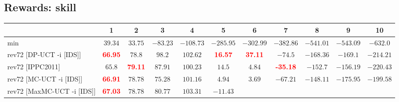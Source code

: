 \documentclass{article}
\begin{document}
\bigskip

\subsection*{Rewards: skill}

\begin{tabular}{|l|r@{$\pm$}rr@{$\pm$}rr@{$\pm$}rr@{$\pm$}rr@{$\pm$}rr@{$\pm$}rr@{$\pm$}rr@{$\pm$}rr@{$\pm$}rr@{$\pm$}r|}
\hline

& \multicolumn{2}{c}{1}
& \multicolumn{2}{c}{2}
& \multicolumn{2}{c}{3}
& \multicolumn{2}{c}{4}
& \multicolumn{2}{c}{5}
& \multicolumn{2}{c}{6}
& \multicolumn{2}{c}{7}
& \multicolumn{2}{c}{8}
& \multicolumn{2}{c}{9}
& \multicolumn{2}{c|}{10}
\\
\hline
\hline
min
& \multicolumn{2}{c}{$39.34$}
& \multicolumn{2}{c}{$33.75$}
& \multicolumn{2}{c}{$-83.23$}
& \multicolumn{2}{c}{$-108.73$}
& \multicolumn{2}{c}{$-285.95$}
& \multicolumn{2}{c}{$-302.99$}
& \multicolumn{2}{c}{$-382.86$}
& \multicolumn{2}{c}{$-541.01$}
& \multicolumn{2}{c}{$-543.09$}
& \multicolumn{2}{c|}{$-632.0$}
\\
rev72 [DP-UCT -i [IDS]]
& \multicolumn{2}{c}{\textbf{\textcolor{red}{66.95}}}
& \multicolumn{2}{c}{$78.8$}
& \multicolumn{2}{c}{$98.2$}
& \multicolumn{2}{c}{$102.62$}
& \multicolumn{2}{c}{\textbf{\textcolor{red}{16.57}}}
& \multicolumn{2}{c}{\textbf{\textcolor{red}{37.11}}}
& \multicolumn{2}{c}{$-74.5$}
& \multicolumn{2}{c}{$-168.36$}
& \multicolumn{2}{c}{$-169.1$}
& \multicolumn{2}{c|}{$-214.21$}
\\
rev72 [IPPC2011]
& \multicolumn{2}{c}{$65.8$}
& \multicolumn{2}{c}{\textbf{\textcolor{red}{79.11}}}
& \multicolumn{2}{c}{$87.91$}
& \multicolumn{2}{c}{$100.23$}
& \multicolumn{2}{c}{$14.5$}
& \multicolumn{2}{c}{$4.84$}
& \multicolumn{2}{c}{\textbf{\textcolor{red}{-35.18}}}
& \multicolumn{2}{c}{$-152.7$}
& \multicolumn{2}{c}{$-156.19$}
& \multicolumn{2}{c|}{$-220.43$}
\\
rev72 [MC-UCT -i [IDS]]
& \multicolumn{2}{c}{\textbf{\textcolor{red}{66.91}}}
& \multicolumn{2}{c}{$78.78$}
& \multicolumn{2}{c}{$75.28$}
& \multicolumn{2}{c}{$101.16$}
& \multicolumn{2}{c}{$4.94$}
& \multicolumn{2}{c}{$3.69$}
& \multicolumn{2}{c}{$-67.21$}
& \multicolumn{2}{c}{$-148.11$}
& \multicolumn{2}{c}{$-175.95$}
& \multicolumn{2}{c|}{$-199.58$}
\\
rev72 [MaxMC-UCT -i [IDS]]
& \multicolumn{2}{c}{\textbf{\textcolor{red}{67.03}}}
& \multicolumn{2}{c}{$78.78$}
& \multicolumn{2}{c}{$80.77$}
& \multicolumn{2}{c}{$103.31$}
& \multicolumn{2}{c}{$-11.43$}

\end{tabular}
\end{document}

